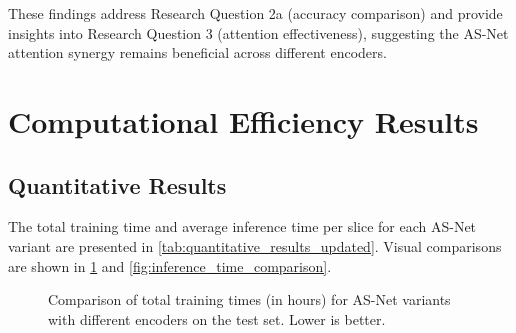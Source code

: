 These findings address Research Question 2a (accuracy comparison) and provide insights into Research Question 3 (attention effectiveness), suggesting the AS-Net attention synergy remains beneficial across different encoders.
\section{Computational Efficiency Results}

\subsection{Quantitative Results}
The total training time and average inference time per slice for each AS-Net variant are presented in \ref{tab:quantitative_results_updated}. Visual comparisons are shown in \ref{fig:training_time_comparison} and \ref{fig:inference_time_comparison}.

\begin{figure}[ht]
  \centering
  \caption[Training Time Comparison]{Comparison of total training times (in hours) for AS-Net variants with different encoders on the test set. Lower is better.}
  \label{fig:training_time_comparison}
\end{figure}

